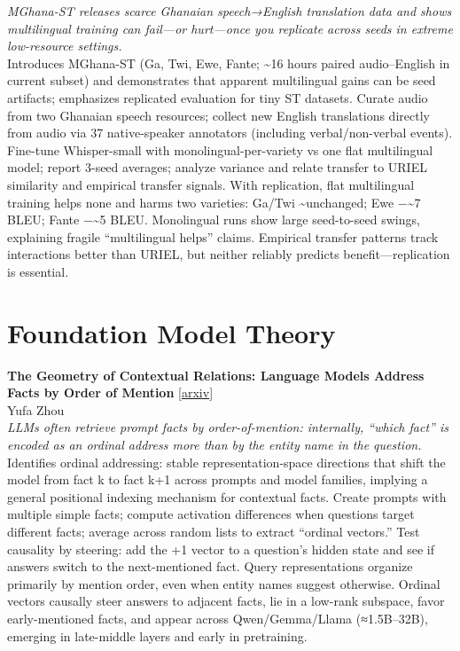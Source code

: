 \documentclass[12pt,letterpaper]{article}
\begin{document}
{\small\textit{MGhana-ST releases scarce Ghanaian speech→English translation data and shows multilingual training can fail---or hurt---once you replicate across seeds in extreme low-resource settings.}}\\[1pt]
{\footnotesize Introduces MGhana-ST (Ga, Twi, Ewe, Fante; \textasciitilde{}16 hours paired audio--English in current subset) and demonstrates that apparent multilingual gains can be seed artifacts; emphasizes replicated evaluation for tiny ST datasets. Curate audio from two Ghanaian speech resources; collect new English translations directly from audio via 37 native-speaker annotators (including verbal/non-verbal events). Fine-tune Whisper-small with monolingual-per-variety vs one flat multilingual model; report 3-seed averages; analyze variance and relate transfer to URIEL similarity and empirical transfer signals. With replication, flat multilingual training helps none and harms two varieties: Ga/Twi \textasciitilde{}unchanged; Ewe −\textasciitilde{}7 BLEU; Fante −\textasciitilde{}5 BLEU. Monolingual runs show large seed-to-seed swings, explaining fragile ``multilingual helps'' claims. Empirical transfer patterns track interactions better than URIEL, but neither reliably predicts benefit---replication is essential.}

\medskip


\section*{Foundation Model Theory}

{\small\textbf{The Geometry of Contextual Relations: Language Models Address Facts by Order of Mention}} {\scriptsize[\href{https://arxiv.org/abs/2610.00910}{arxiv}]}\\
{\scriptsize Yufa Zhou}\\

{\small\textit{LLMs often retrieve prompt facts by order-of-mention: internally, ``which fact'' is encoded as an ordinal address more than by the entity name in the question.}}\\[1pt]
{\footnotesize Identifies ordinal addressing: stable representation-space directions that shift the model from fact k to fact k+1 across prompts and model families, implying a general positional indexing mechanism for contextual facts. Create prompts with multiple simple facts; compute activation differences when questions target different facts; average across random lists to extract ``ordinal vectors.'' Test causality by steering: add the +1 vector to a question's hidden state and see if answers switch to the next-mentioned fact. Query representations organize primarily by mention order, even when entity names suggest otherwise. Ordinal vectors causally steer answers to adjacent facts, lie in a low-rank subspace, favor early-mentioned facts, and appear across Qwen/Gemma/Llama (≈1.5B--32B), emerging in late-middle layers and early in pretraining.}
\end{document}
